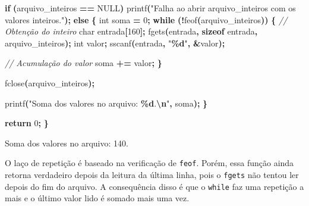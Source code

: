 \documentclass[
  11pt,
  a4paper,
]{scrbook}
\newenvironment{Shaded}{\begin{snugshade}}{\end{snugshade}}
\newcommand{\CommentTok}[1]{\textcolor[rgb]{0.56,0.35,0.01}{\textit{#1}}}
\newcommand{\ControlFlowTok}[1]{\textcolor[rgb]{0.13,0.29,0.53}{\textbf{#1}}}
\newcommand{\DataTypeTok}[1]{\textcolor[rgb]{0.13,0.29,0.53}{#1}}
\newcommand{\DecValTok}[1]{\textcolor[rgb]{0.00,0.00,0.81}{#1}}
\newcommand{\KeywordTok}[1]{\textcolor[rgb]{0.13,0.29,0.53}{\textbf{#1}}}
\newcommand{\NormalTok}[1]{#1}
\newcommand{\OperatorTok}[1]{\textcolor[rgb]{0.81,0.36,0.00}{\textbf{#1}}}
\newcommand{\SpecialCharTok}[1]{\textcolor[rgb]{0.81,0.36,0.00}{\textbf{#1}}}
\newcommand{\StringTok}[1]{\textcolor[rgb]{0.31,0.60,0.02}{#1}}
\begin{document}
\begin{tcolorbox}
\begin{Shaded}
\begin{Highlighting}[]
    \ControlFlowTok{if} \OperatorTok{(}\NormalTok{arquivo\_inteiros }\OperatorTok{==}\NormalTok{ NULL}\OperatorTok{)}
\NormalTok{        printf}\OperatorTok{(}\StringTok{"Falha ao abrir arquivo\_inteiros com os valores inteiros."}\OperatorTok{);}
    \ControlFlowTok{else} \OperatorTok{\{}
        \DataTypeTok{int}\NormalTok{ soma }\OperatorTok{=} \DecValTok{0}\OperatorTok{;}
        \ControlFlowTok{while} \OperatorTok{(!}\NormalTok{feof}\OperatorTok{(}\NormalTok{arquivo\_inteiros}\OperatorTok{))} \OperatorTok{\{}
            \CommentTok{// Obtenção do inteiro}
            \DataTypeTok{char}\NormalTok{ entrada}\OperatorTok{[}\DecValTok{160}\OperatorTok{];}
\NormalTok{            fgets}\OperatorTok{(}\NormalTok{entrada}\OperatorTok{,} \KeywordTok{sizeof}\NormalTok{ entrada}\OperatorTok{,}\NormalTok{ arquivo\_inteiros}\OperatorTok{);}
            \DataTypeTok{int}\NormalTok{ valor}\OperatorTok{;}
\NormalTok{            sscanf}\OperatorTok{(}\NormalTok{entrada}\OperatorTok{,} \StringTok{"}\SpecialCharTok{\%d}\StringTok{"}\OperatorTok{,} \OperatorTok{\&}\NormalTok{valor}\OperatorTok{);}

            \CommentTok{// Acumulação do valor}
\NormalTok{            soma }\OperatorTok{+=}\NormalTok{ valor}\OperatorTok{;}
        \OperatorTok{\}}

\NormalTok{        fclose}\OperatorTok{(}\NormalTok{arquivo\_inteiros}\OperatorTok{);}

\NormalTok{        printf}\OperatorTok{(}\StringTok{"Soma dos valores no arquivo: }\SpecialCharTok{\%d}\StringTok{.}\SpecialCharTok{\textbackslash{}n}\StringTok{"}\OperatorTok{,}\NormalTok{ soma}\OperatorTok{);}
    \OperatorTok{\}}
    
    \ControlFlowTok{return} \DecValTok{0}\OperatorTok{;}
\OperatorTok{\}}
\end{Highlighting}
\end{Shaded}

\begin{Shaded}
\begin{Highlighting}[]
\NormalTok{Soma dos valores no arquivo: 140.}
\end{Highlighting}
\end{Shaded}

O laço de repetição é baseado na verificação de \texttt{feof}. Porém,
essa função ainda retorna verdadeiro depois da leitura da última linha,
pois o \texttt{fgets} não tentou ler depois do fim do arquivo. A
consequência disso é que o \texttt{while} faz uma repetição a mais e o
último valor lido é somado mais uma vez.


\end{tcolorbox}
\end{document}
